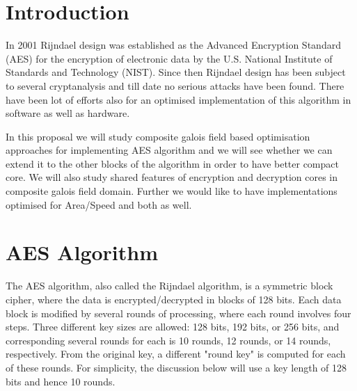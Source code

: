 \documentclass[10pt, conference, compsocconf]{IEEEtran}
\begin{document}
\maketitle



\section{Introduction}
In 2001 Rijndael design was established as the Advanced Encryption Standard (AES) for the encryption of electronic data by the U.S. National Institute of Standards and Technology (NIST). Since then Rijndael design has been subject to several cryptanalysis and till date no serious attacks have been found. There have been lot of efforts also for an optimised implementation of this algorithm in software as well as hardware.

In this proposal we will study composite galois field based optimisation approaches for implementing AES algorithm and we will see whether we can extend it to the other blocks of the algorithm in order to have better compact core. We will also study shared features of encryption and decryption cores in composite galois field domain. Further we would like to have implementations optimised for Area/Speed and both as well.

\section{AES Algorithm}
The AES algorithm, also called the Rijndael algorithm, is a symmetric block cipher, where the data is encrypted/decrypted in blocks of 128 bits. Each data block is modified by several rounds of processing, where each round involves four steps. Three different key sizes are allowed: 128 bits, 192 bits, or 256 bits, and corresponding several rounds for each is 10 rounds, 12 rounds, or 14 rounds, respectively. From the original key, a different "round key" is computed for each of these rounds. For simplicity, the discussion below will use a key length of 128 bits and hence 10 rounds.
\end{document}
